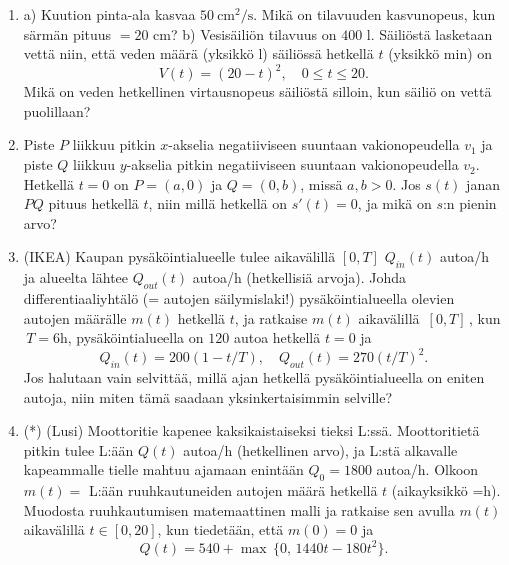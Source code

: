 \begin{enumerate}
\item
a) Kuution pinta-ala kasvaa $50\ \text{cm}^2/\text{s}$. Mikä on tilavuuden kasvunopeus, kun
särmän pituus $=20$ cm? \vspace{1mm}\newline
b) Vesisäiliön tilavuus on $400$ l. Säiliöstä lasketaan vettä niin, että veden määrä
(yksikkö l) säiliössä hetkellä $t$ (yksikkö min) on
\[
V(t)=(20-t)^2, \quad 0 \le t \le 20.
\]
Mikä on veden hetkellinen virtausnopeus säiliöstä silloin, kun säiliö on vettä puolillaan?

\item
Piste $P$ liikkuu pitkin $x$-akselia negatiiviseen suuntaan vakionopeudella $v_1$ ja piste $Q$
liikkuu $y$-akselia pitkin negatiiviseen suuntaan vakionopeudella $v_2$. Hetkellä $t=0$ on
$P=(a,0)$ ja $Q=(0,b)$, missä $a,b>0$. Jos $s(t)$ janan $PQ$ pituus hetkellä $t$, niin millä 
hetkellä on $s'(t)=0$, ja mikä on $s$:n pienin arvo?

\item {}
(IKEA) Kaupan pysäköintialueelle tulee aikavälillä $[0,T]$ $Q_{in}(t)$ autoa/h ja alueelta
lähtee $Q_{out}(t)$ autoa/h (hetkellisiä arvoja). Johda differentiaaliyhtälö
(= autojen säilymislaki!) pysäköintialueella olevien autojen määrälle $m(t)$ hetkellä $t$, ja
ratkaise $m(t)$ aikavälillä $\,[0,T]\,$, kun $\,T=6$h, pysäköinti\-alueella on $120$ autoa
hetkellä $t=0$ ja
\[
Q_{in}(t)=200(1-t/T), \quad Q_{out}(t)=270(t/T)^2.
\]
Jos halutaan vain selvittää, millä ajan hetkellä pysäköintialueella on eniten autoja, niin
miten tämä saadaan yksinkertaisimmin selville?

\item (*) 
(Lusi) Moottoritie kapenee kaksikaistaiseksi tieksi L:ssä. Moottoritietä pitkin tulee L:ään
$Q(t)$ autoa/h (hetkellinen arvo), ja L:stä alkavalle kapeammalle tielle mahtuu ajamaan
enintään $Q_0=1800$ autoa/h. Olkoon $m(t)=$ L:ään ruuhkautuneiden autojen määrä hetkellä
$t$ (aikayksikkö =h). Muodosta ruuhkautumisen matemaattinen malli ja ratkaise sen avulla
$m(t)$ aikavälillä $t\in[0,20]$, kun tiedetään, että $m(0)=0$ ja
\[
Q(t)=540+\max\,\{0,\,1440t-180t^2\}.
\]


\end{enumerate}
